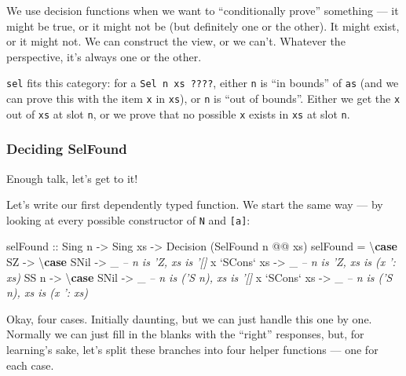 \documentclass[]{article}
\newenvironment{Shaded}{}{}
\newcommand{\CommentTok}[1]{\textcolor[rgb]{0.38,0.63,0.69}{\textit{#1}}}
\newcommand{\DataTypeTok}[1]{\textcolor[rgb]{0.56,0.13,0.00}{#1}}
\newcommand{\FunctionTok}[1]{\textcolor[rgb]{0.02,0.16,0.49}{#1}}
\newcommand{\KeywordTok}[1]{\textcolor[rgb]{0.00,0.44,0.13}{\textbf{#1}}}
\newcommand{\NormalTok}[1]{#1}
\newcommand{\OtherTok}[1]{\textcolor[rgb]{0.00,0.44,0.13}{#1}}
\begin{document}
We use decision functions when we want to ``conditionally prove'' something ---
it might be true, or it might not be (but definitely one or the other). It might
exist, or it might not. We can construct the view, or we can't. Whatever the
perspective, it's always one or the other.

\texttt{sel} fits this category: for a \texttt{Sel\ n\ xs\ ????}, either
\texttt{n} is ``in bounds'' of \texttt{as} (and we can prove this with the item
\texttt{x} in \texttt{xs}), or \texttt{n} is ``out of bounds''. Either we get
the \texttt{x} out of \texttt{xs} at slot \texttt{n}, or we prove that no
possible \texttt{x} exists in \texttt{xs} at slot \texttt{n}.

\hypertarget{deciding-selfound}{%
\subsubsection{Deciding SelFound}\label{deciding-selfound}}

Enough talk, let's get to it!

Let's write our first dependently typed function. We start the same way --- by
looking at every possible constructor of \texttt{N} and \texttt{{[}a{]}}:

\begin{Shaded}
\begin{Highlighting}[]
\NormalTok{selFound}
\OtherTok{    ::} \DataTypeTok{Sing}\NormalTok{ n}
    \OtherTok{->} \DataTypeTok{Sing}\NormalTok{ xs}
    \OtherTok{->} \DataTypeTok{Decision}\NormalTok{ (}\DataTypeTok{SelFound}\NormalTok{ n }\FunctionTok{@@}\NormalTok{ xs)}
\NormalTok{selFound }\FunctionTok{=}\NormalTok{ \textbackslash{}}\KeywordTok{case}
    \DataTypeTok{SZ} \OtherTok{->}\NormalTok{ \textbackslash{}}\KeywordTok{case}
      \DataTypeTok{SNil}         \OtherTok{->}\NormalTok{ _   }\CommentTok{-- n is 'Z, xs is '[]}
\NormalTok{      x }\OtherTok{`SCons`}\NormalTok{ xs }\OtherTok{->}\NormalTok{ _   }\CommentTok{-- n is 'Z, xs is (x ': xs)}
    \DataTypeTok{SS}\NormalTok{ n }\OtherTok{->}\NormalTok{ \textbackslash{}}\KeywordTok{case}
      \DataTypeTok{SNil}         \OtherTok{->}\NormalTok{ _   }\CommentTok{-- n is ('S n), xs is '[]}
\NormalTok{      x }\OtherTok{`SCons`}\NormalTok{ xs }\OtherTok{->}\NormalTok{ _   }\CommentTok{-- n is ('S n), xs is (x ': xs)}
\end{Highlighting}
\end{Shaded}

Okay, four cases. Initially daunting, but we can just handle this one by one.
Normally we can just fill in the blanks with the ``right'' responses, but, for
learning's sake, let's split these branches into four helper functions --- one
for each case.
\end{document}
